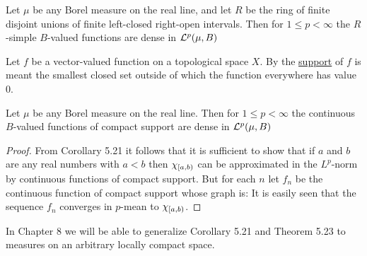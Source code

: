 \begin{corollary}
Let $\mu$ be any Borel measure on the real line, and let $R$ be the ring of finite disjoint unions of finite left-closed right-open intervals. Then for $1\leq p<\infty$ the $R$-simple $B$-valued functions are dense in ${\cal L}^p(\mu, B)$
\end{corollary}

\begin{definition}
Let $f$ be a vector-valued function on a topological space $X$. By the \underline{support} of $f$ is meant the smallest closed set outside of which the function everywhere has value $0$.
\end{definition}

\begin{theorem}
Let $\mu$ be any Borel measure on the real line. Then for $1\leq p<\infty$ the continuous $B$-valued functions of compact support are dense in ${\cal L}^p(\mu, B)$
\end{theorem}

\begin{proof}
From Corollary 5.21 it follows that it is sufficient to show that if $a$ and $b$ are any real numbers with $a<b$ then $\chi_{[a, b)}$ can be approximated in the $L^p$-norm by continuous functions of compact support. But for each $n$ let $f_n$ be the continuous function of compact support whose graph is:
It is easily seen that the sequence $f_n$ converges in $p$-mean to $\chi_{[a, b)}$.
\end{proof}

In Chapter 8 we will be able to generalize Corollary 5.21 and Theorem 5.23 to measures on an arbitrary locally compact space.